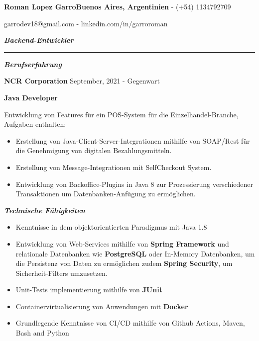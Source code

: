 \documentclass{article}
\begin{document}
\fontsize{18pt}{0pt}
\noindent\textbf{Roman Lopez Garro}\hfill\fontsize{10pt}{0pt}\textbf{Buenos Aires, Argentinien} - (+54) 1134792709

\hfill garrodev18@gmail.com - linkedin.com/in/garroroman

\vspace{1mm}

\fontsize{13pt}{0pt}
\noindent\textit{\textbf{Backend-Entwickler}}
\par\noindent\rule{\textwidth}{0.4pt}

\vspace{4mm}
\fontsize{12pt}{0pt}
\begin{center}
    \textit{\textbf{Berufserfahrung}}
\end{center}

\vspace{1mm}
\setlength{\parindent}{11pt}\fontsize{10pt}{0pt}\textbf{NCR Corporation} \hfill September, 2021 - Gegenwart

\vspace{1mm}
\setlength{\parindent}{11pt}\fontsize{10pt}{0pt}\textbf{Java Developer}

\vspace{4mm}
\indent Entwicklung von Features für ein POS-System für die Einzelhandel-Branche, Aufgaben enthalten:
\begin{itemize}
    \item Erstellung von Java-Client-Server-Integrationen mithilfe von SOAP/Rest für die Genehmigung von digitalen Bezahlungsmitteln.
    \item Erstellung von Message-Integrationen mit SelfCheckout System.
    \item Entwicklung von Backoffice-Plugins in Java 8 zur Prozessierung verschiedener Transaktionen um Datenbanken-Anfügung zu ermöglichen.

\end{itemize}

\vspace{4mm}
\fontsize{12pt}{0pt}
\begin{center}
    \textit{\textbf{Technische Fähigkeiten}}
\end{center}

\fontsize{9pt}{0pt}
\noindent
\begin{itemize}
    \item Kenntnisse in dem objektorientierten Paradigmus mit Java 1.8
    \item Entwicklung von Web-Services mithilfe von \textbf{Spring Framework} und relationale Datenbanken wie \textbf{PostgreSQL} oder In-Memory Datenbanken, um die Persistenz von Daten zu ermöglichen zudem \textbf{Spring Security}, um Sicherheit-Filters umzusetzen.
    \item Unit-Tests implementierung mithilfe von \textbf{JUnit}
    \item Containervirtualisierung von Anwendungen mit \textbf{Docker}
    \item Grundlegende Kenntnisse von CI/CD mithilfe von Github Actions, Maven, Bash and Python
\end{itemize}
\end{document}

